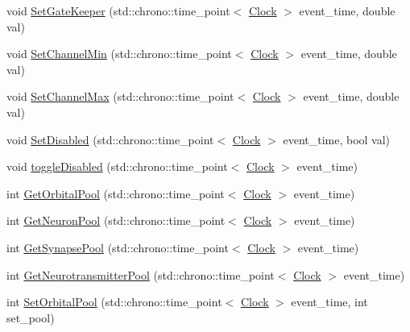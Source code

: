 \begin{DoxyCompactItemize}
\item 
void \hyperlink{class_cognitive_network_a83bc4047721417212fa1bbbfa64da5ee}{Set\+Gate\+Keeper} (std\+::chrono\+::time\+\_\+point$<$ \hyperlink{universe_8h_a0ef8d951d1ca5ab3cfaf7ab4c7a6fd80}{Clock} $>$ event\+\_\+time, double val)
\item 
void \hyperlink{class_cognitive_network_a6e2a6ced4ede9a4eef721d6c5aac433c}{Set\+Channel\+Min} (std\+::chrono\+::time\+\_\+point$<$ \hyperlink{universe_8h_a0ef8d951d1ca5ab3cfaf7ab4c7a6fd80}{Clock} $>$ event\+\_\+time, double val)
\item 
void \hyperlink{class_cognitive_network_a9c208d66ee284adfceb3b2dd76532a00}{Set\+Channel\+Max} (std\+::chrono\+::time\+\_\+point$<$ \hyperlink{universe_8h_a0ef8d951d1ca5ab3cfaf7ab4c7a6fd80}{Clock} $>$ event\+\_\+time, double val)
\item 
void \hyperlink{class_cognitive_network_ac29e676c84244f5b64c0083a0efead28}{Set\+Disabled} (std\+::chrono\+::time\+\_\+point$<$ \hyperlink{universe_8h_a0ef8d951d1ca5ab3cfaf7ab4c7a6fd80}{Clock} $>$ event\+\_\+time, bool val)
\item 
void \hyperlink{class_cognitive_network_abeac08d7cbf9df4b36de40aa9301e978}{toggle\+Disabled} (std\+::chrono\+::time\+\_\+point$<$ \hyperlink{universe_8h_a0ef8d951d1ca5ab3cfaf7ab4c7a6fd80}{Clock} $>$ event\+\_\+time)
\item 
int \hyperlink{class_cognitive_network_af5995eaa4ba35c555a6b65d895451f25}{Get\+Orbital\+Pool} (std\+::chrono\+::time\+\_\+point$<$ \hyperlink{universe_8h_a0ef8d951d1ca5ab3cfaf7ab4c7a6fd80}{Clock} $>$ event\+\_\+time)
\item 
int \hyperlink{class_cognitive_network_af81132245e486c496a055f54a5a520d0}{Get\+Neuron\+Pool} (std\+::chrono\+::time\+\_\+point$<$ \hyperlink{universe_8h_a0ef8d951d1ca5ab3cfaf7ab4c7a6fd80}{Clock} $>$ event\+\_\+time)
\item 
int \hyperlink{class_cognitive_network_ae0068b9df823e1b10fed3c73f1cb4702}{Get\+Synapse\+Pool} (std\+::chrono\+::time\+\_\+point$<$ \hyperlink{universe_8h_a0ef8d951d1ca5ab3cfaf7ab4c7a6fd80}{Clock} $>$ event\+\_\+time)
\item 
int \hyperlink{class_cognitive_network_a4e5b1d60cda4ddb4bd04d8dca42b7a5b}{Get\+Neurotransmitter\+Pool} (std\+::chrono\+::time\+\_\+point$<$ \hyperlink{universe_8h_a0ef8d951d1ca5ab3cfaf7ab4c7a6fd80}{Clock} $>$ event\+\_\+time)
\item 
int \hyperlink{class_cognitive_network_aaa3929bfba068659e9681f85deaf79cb}{Set\+Orbital\+Pool} (std\+::chrono\+::time\+\_\+point$<$ \hyperlink{universe_8h_a0ef8d951d1ca5ab3cfaf7ab4c7a6fd80}{Clock} $>$ event\+\_\+time, int set\+\_\+pool)

\end{DoxyCompactItemize}
